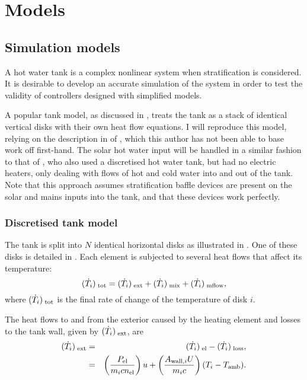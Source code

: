 \chapter{Models}

\section{Simulation models}

A hot water tank is a complex nonlinear system when stratification is considered.
It is desirable to develop an accurate simulation of the system in order to test the validity of controllers designed with simplified models.

A popular tank model, as discussed in , treats the tank as a stack of identical vertical disks with their own heat flow equations.
I will reproduce this model, relying on the description in \textcite{Pfeiffer11} of \textcite{Koch11}, which this author has not been able to base work off first-hand.
The solar hot water input will be handled in a similar fashion to that of \textcite{Cristofari02}, who also used a discretised hot water tank, but had no electric heaters, only dealing with flows of hot and cold water into and out of the tank.
Note that this approach assumes stratification baffle devices are present on the solar and mains inputs into the tank, and that these devices work perfectly.

\subsection{Discretised tank model}

The tank is split into $N$ identical horizontal disks as illustrated in .
One of these disks is detailed in .
Each element is subjected to several heat flows that affect its temperature:
\begin{equation}
	(\dot{T}_i)_{\;\text{tot}} = (\dot{T}_i)_{\;\text{ext}} + (\dot{T}_i)_{\;\text{mix}} + (\dot{T}_i)_{\;\text{mflow}},
\end{equation}
where $(\dot{T}_i)_{\;\text{tot}}$ is the final rate of change of the temperature of disk $i$.

The heat flows to and from the exterior caused by the heating element and losses to the tank wall, given by $(\dot{T}_i)_{\;\text{ext}}$, are
\begin{eqnarray}
	(\dot{T}_i)_{\;\text{ext}} &=& (\dot{T}_i)_{\;\text{el}} - (\dot{T}_i)_{\;\text{loss}}, \nonumber\\
	           &=& \left(\frac{P_{\text{el}}}{m_i c n_{\text{el}}}\right) u
	             + \left(\frac{A_{\text{wall}, i} U}{m_i c}\right) (T_i - T_{\text{amb}}).
\end{eqnarray}

